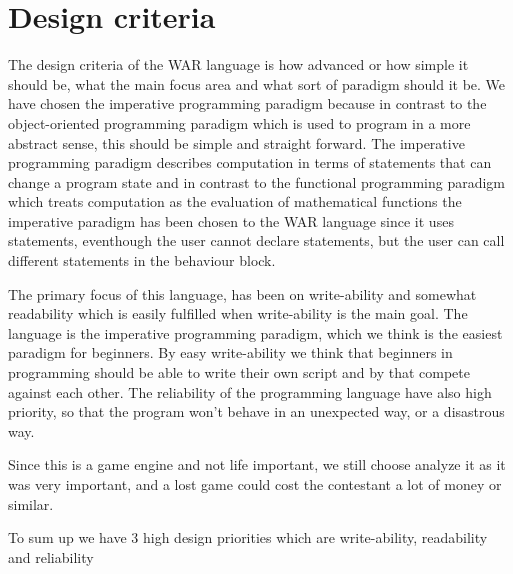 
\section{Design criteria}

The design criteria of the WAR language is how advanced or how simple it should be, what the main focus area and what sort of paradigm should it be. We have chosen the imperative programming paradigm because in contrast to the object-oriented programming paradigm which is used to program in a more abstract sense, this should be simple and straight forward. The imperative programming paradigm describes computation in terms of statements that can change a program state and in contrast to the functional programming paradigm which treats computation as the evaluation of mathematical functions the imperative paradigm has been chosen to the WAR language since it uses statements, eventhough the user cannot declare statements, but the user can call different statements in the behaviour block. 


The primary focus of this language, has been on write-ability and somewhat readability which is easily fulfilled when write-ability is the main goal. The language is the imperative programming paradigm, which we think is the easiest paradigm for beginners. By easy write-ability we think that beginners in programming should be able to write their own script and by that compete against each other. The reliability of the programming language have also high priority, so that the program won't behave in an unexpected way, or a disastrous way.

 
Since this is a game engine and not life important, we still choose analyze it as it was very important, and a lost game could cost the contestant a lot of money or similar.

To sum up we have 3 high design priorities which are write-ability, readability and reliability